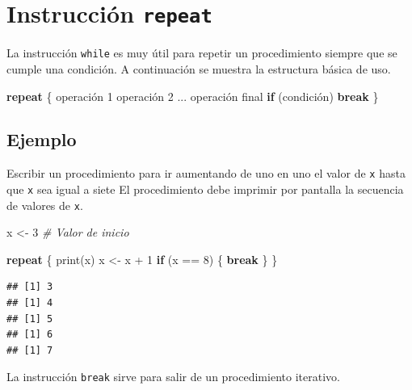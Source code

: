 \documentclass[
]{book}
\makeatletter
\newenvironment{Shaded}{\begin{snugshade}}{\end{snugshade}}
\newcommand{\CommentTok}[1]{\textcolor[rgb]{0.56,0.35,0.01}{\textit{#1}}}
\newcommand{\ControlFlowTok}[1]{\textcolor[rgb]{0.13,0.29,0.53}{\textbf{#1}}}
\newcommand{\DecValTok}[1]{\textcolor[rgb]{0.00,0.00,0.81}{#1}}
\newcommand{\FunctionTok}[1]{\textcolor[rgb]{0.00,0.00,0.00}{#1}}
\newcommand{\NormalTok}[1]{#1}
\newcommand{\OtherTok}[1]{\textcolor[rgb]{0.56,0.35,0.01}{#1}}
\newcommand{\SpecialCharTok}[1]{\textcolor[rgb]{0.00,0.00,0.00}{#1}}
\newenvironment{kframe}{%
\medskip{}
\setlength{\fboxsep}{.8em}
 \def\at@end@of@kframe{}%
 \ifinner\ifhmode%
  \def\at@end@of@kframe{\end{minipage}}%
  \begin{minipage}{\columnwidth}%
 \fi\fi%
 \def\FrameCommand##1{\hskip\@totalleftmargin \hskip-\fboxsep
 \colorbox{shadecolor}{##1}\hskip-\fboxsep
     \hskip-\linewidth \hskip-\@totalleftmargin \hskip\columnwidth}%
 \MakeFramed {\advance\hsize-\width
   \@totalleftmargin\z@ \linewidth\hsize
   \@setminipage}}%
 {\par\unskip\endMakeFramed%
 \at@end@of@kframe}
\renewenvironment{Shaded}{\begin{kframe}}{\end{kframe}}
\newenvironment{rmdblock}[1]
  {
  \begin{itemize}
  \renewcommand{\labelitemi}{
    \raisebox{-.7\height}[0pt][0pt]{
      {\setkeys{Gin}{width=3em,keepaspectratio}\texttt{[image: images/\#1]}}
    }
  }
  \setlength{\fboxsep}{1em}
  \begin{kframe}
  \item
  }
  {
  \end{kframe}
  \end{itemize}
  }
\newenvironment{rmdtip}
  {\begin{rmdblock}{tip}}
  {\end{rmdblock}}
\makeatother
\begin{document}
\hypertarget{instrucciuxf3n-repeat}{%
\section{\texorpdfstring{Instrucción \texttt{repeat}}{Instrucción repeat}}\label{instrucciuxf3n-repeat}}

La instrucción \texttt{while} es muy útil para repetir un procedimiento siempre que se cumple una condición. A continuación se muestra la estructura básica de uso.

\begin{Shaded}
\begin{Highlighting}[]
\ControlFlowTok{repeat}\NormalTok{ \{}
\NormalTok{  operación }\DecValTok{1}
\NormalTok{  operación }\DecValTok{2}
\NormalTok{  ...}
\NormalTok{  operación final}
  \ControlFlowTok{if}\NormalTok{ (condición) }\ControlFlowTok{break}
\NormalTok{\}}
\end{Highlighting}
\end{Shaded}

\hypertarget{ejemplo-19}{%
\subsection*{Ejemplo}\label{ejemplo-19}}

Escribir un procedimiento para ir aumentando de uno en uno el valor de \texttt{x} hasta que \texttt{x} sea igual a siete El procedimiento debe imprimir por pantalla la secuencia de valores de \texttt{x}.

\begin{Shaded}
\begin{Highlighting}[]
\NormalTok{x }\OtherTok{\textless{}{-}} \DecValTok{3}  \CommentTok{\# Valor de inicio}

\ControlFlowTok{repeat}\NormalTok{ \{}
   \FunctionTok{print}\NormalTok{(x)}
\NormalTok{   x }\OtherTok{\textless{}{-}}\NormalTok{  x }\SpecialCharTok{+} \DecValTok{1}
   \ControlFlowTok{if}\NormalTok{ (x }\SpecialCharTok{==} \DecValTok{8}\NormalTok{) \{}
     \ControlFlowTok{break}
\NormalTok{   \}}
\NormalTok{\}}
\end{Highlighting}
\end{Shaded}

\begin{verbatim}
## [1] 3
## [1] 4
## [1] 5
## [1] 6
## [1] 7
\end{verbatim}

\begin{rmdtip}
La instrucción \texttt{break} sirve para salir de un procedimiento iterativo.
\end{rmdtip}
\end{document}
